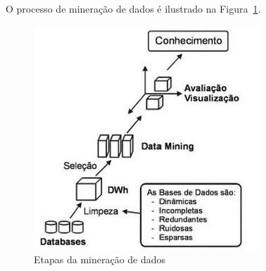 O processo de mineração de dados é ilustrado na Figura~\ref{fig:mineracao}.
\begin{figure}
	\centering
	\caption{Etapas da mineração de dados}\label{fig:mineracao}
	\includegraphics[scale=1.0]{mineracao}
	
\end{figure}



